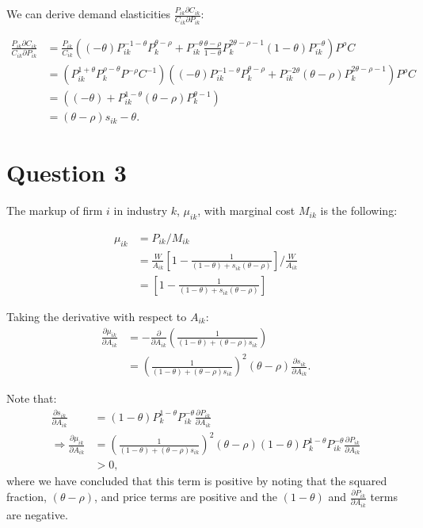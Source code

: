 \documentclass[11pt]{article} %
\begin{document}
We can derive demand elasticities $\frac{P_{ik}\partial C_{ik}}{C_{ik}\partial P_{ik}}$:

\begin{align*}
\frac{P_{ik}\partial C_{ik}}{C_{ik}\partial P_{ik}} &= \frac{P_{ik}}{C_{ik}}\left( (-\theta)P_{ik}^{-1-\theta}P_{k}^{\theta - \rho} + P_{ik}^{-\theta} \frac{ \theta-\rho}{1-\theta } P_{k}^{2\theta - \rho - 1}(1-\theta)P_{ik}^{-\theta}  \right) P^{\rho} C\\
&=\left(P_{ik}^{1+\theta} P_{k}^{\rho - \theta} P^{-\rho} C^{-1} \right)\left( (-\theta)P_{ik}^{-1-\theta}P_{k}^{\theta - \rho} + P_{ik}^{-2\theta} (\theta-\rho) P_{k}^{2\theta - \rho - 1}  \right) P^{\rho} C\\
&=\left( (-\theta) + P_{ik}^{1-\theta} (\theta-\rho) P_{k}^{\theta  - 1}  \right) \\
&= (\theta - \rho)s_{ik} - \theta.
\end{align*}

\section{Question 3}

The markup of firm $i$ in industry $k$, $\mu_{ik}$, with marginal cost $M_{ik}$  is the following:

\begin{align*}
\mu_{ik} &= P_{ik} / M_{ik}\\
&=  \frac{W}{A_{ik}}\left[ 1 - \frac{1}{(1-\theta) +  s_{ik} (\theta - \rho)} \right] / \frac{W}{A_{ik}}\\
&=  \left[1 - \frac{1}{(1-\theta) +  s_{ik} (\theta - \rho)}\right]
\end{align*}

Taking the derivative with respect to $A_{ik}$:
\begin{align*}
\frac{\partial \mu_{ik}}{\partial A_{ik}} &= -\frac{\partial }{\partial A_{ik}}\left( \frac{1}{(1-\theta)+(\theta - \rho)s_{ik}} \right)\\
&= \left( \frac{1}{(1-\theta)+(\theta - \rho)s_{ik}} \right)^{2}(\theta - \rho)\frac{\partial s_{ik}}{\partial A_{ik}}.
\end{align*}

Note that:
\begin{align*}
\frac{\partial s_{ik}}{\partial A_{ik}} &= (1-\theta)P_{k}^{1-\theta}P_{ik}^{-\theta}\frac{\partial P_{ik}}{\partial A_{ik}}\\
\Rightarrow \frac{\partial \mu_{ik}}{\partial A_{ik}} &= \left( \frac{1}{(1-\theta)+(\theta - \rho)s_{ik}} \right)^{2}(\theta - \rho) (1-\theta)P_{k}^{1-\theta}P_{ik}^{-\theta}\frac{\partial P_{ik}}{\partial A_{ik}}\\
&>0,
\end{align*}
where we have concluded that this term is positive by noting that the squared fraction, $(\theta - \rho)$, and price terms are positive and the $(1-\theta)$ and $\frac{\partial P_{ik}}{\partial A_{ik}}$ terms are negative.
\end{document}
